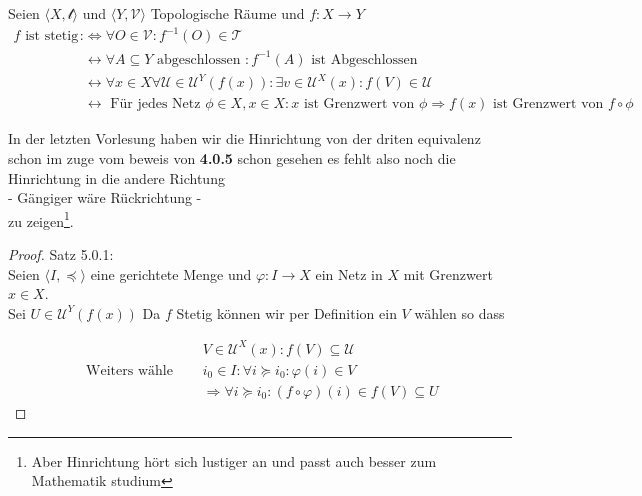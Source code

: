 \chapter{}


{
    Seien $\langle X, \mathcal{t} \rangle$ und 
    $\langle Y, \mathcal{V}\rangle$
    Topologische Räume und $f : X \to Y$
    \begin{equation*} 
    \begin{split}
        f \text{ ist stetig } :
        &\Leftrightarrow \forall O \in \mathcal{V} 
        : f^{-1}(O) \in \mathcal{T}\\
        &\leftrightarrow  \forall A \subseteq Y \text{ abgeschlossen } 
        : f^{-1}(A) \text{ ist Abgeschlossen }\\
        &\leftrightarrow \forall x \in X \forall \mathcal{U} 
        \in \mathscr{U}^{Y}(f(x)) :
        \exists v \in \mathcal{U}^{X}(x) : f(V) \in \mathscr{U}\\
        &\leftrightarrow \text{ Für jedes Netz } \phi \in X,
        x \in X: x \text{ ist Grenzwert von } 
        \phi \Rightarrow f(x) \text{ ist Grenzwert von } f \circ \phi
    \end{split}
    \end{equation*}
}

In der letzten Vorlesung haben wir die Hinrichtung von der driten equivalenz schon im zuge vom beweis von \textbf{4.0.5} schon gesehen es fehlt also noch 
die Hinrichtung in die andere Richtung \\
- Gängiger wäre Rückrichtung - \\
zu zeigen\footnote{Aber Hinrichtung
hört sich lustiger an und passt auch besser zum Mathematik studium}. 

\begin{proof}{Satz 5.0.1:}\\
    Seien $\langle I, \preccurlyeq \rangle$ eine gerichtete Menge und
    $\varphi : I \to X$ ein Netz in $X$ mit Grenzwert $x \in X$.\\
    Sei $U \in\mathcal{U}^{Y}(f(x))$
    Da  $f$  Stetig können wir per Definition ein $V$ wählen so dass

    \begin{equation*} 
    \begin{split}
    &V \in \mathcal{U}^{X}(x):f(V) \subseteq \mathcal{U}\\
    \text{ Weiters wähle } \quad &i_0 \in I: \forall i \succcurlyeq i_0: \varphi(i) \in V\\
    &\Rightarrow \forall i \succcurlyeq i_0: (f\circ \varphi)(i) \in f(V) \subseteq U
    \end{split}
    \end{equation*}
    
\end{proof}
